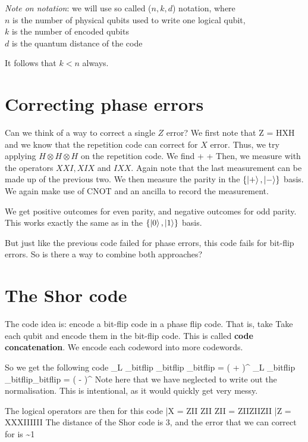 \emph{Note on notation}: we will use so called ($n,k,d$) notation,  where \\
$n$ is the number of physical qubits used to write one logical qubit, \\$k$ is the number of encoded qubits \\
$d$ is the quantum distance of the code

It follows that $k < n$ always. 

\section{Correcting phase errors}
Can we think of a way to correct a single $Z$ error? We first note that 
\beq
Z = HXH
\eeq
and we know that the repetition code can correct for $X$ error. Thus, we try applying $H\otimes H\otimes H $ on the repetition code. We find
\beq
\alpha {} + \beta {} \rightarrow \alpha \ket{+++} + \beta \ket{---}
\eeq
Then, we measure with the operators $XXI, XIX$ and $IXX$. Again note that the last measurement can be made up of the previous two. We then measure the parity in the $\{\ket{+}, \ket{-}\}$ basis. We again make use of   CNOT and an ancilla to record the measurement. 

We get positive outcomes for even parity, and negative outcomes for odd parity. This works exactly the same as in the $\{\ket{0}, \ket{1}\}$ basis. 

But just like the previous code failed for phase errors, this code fails for bit-flip errors. So is there a way to combine both approaches? 

\section{The Shor code}
The code idea is: encode a bit-flip code in a phase flip code. That is, take
\beq
\ket{+} \rightarrow \ket{+++}
\eeq
\beq
\ket{-} \rightarrow \ket{---}
\eeq
Take each qubit and encode them in the bit-flip code. This is called \textbf{code concatenation}. We encode each codeword into more codewords. 

So we get the following code
\beq
{}_L \rightarrow \ket{+}_{bitflip} \ket{+}_{bitflip} \ket{+}_{bitflip} = \left(  +  \right)^{}
\eeq
\beq
{}_L \rightarrow \ket{-}_{bitflip} \ket{-}_{bitflip}\ket{-}_{bitflip} = \left( -  \right)^{}
\eeq
Note here that we have neglected to write out the normalisation. This is intentional, as it would quickly get very messy. 

The logical operators are then for this code
\beq
\bar{X} = ZII \otimes ZII \otimes ZII = ZIIZIIZII
\eeq
\beq
\bar{Z} = XXXIIIIII
\eeq
The distance of the Shor code is 3, and the error that we can correct for is
\beq
{} \sim 1
\eeq


